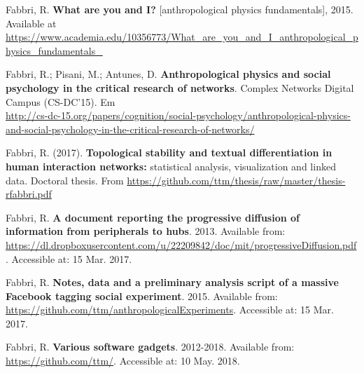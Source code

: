 \documentclass[a4paper]{article}
\begin{document}
\begin{thebibliography}{9}
	Fabbri, R. \textbf{What are you and I?} [anthropological physics fundamentals], 2015. Available at \url{https://www.academia.edu/10356773/What\_are\_you\_and\_I\_anthropological\_physics\_fundamentals\_}

	Fabbri, R.; Pisani, M.; Antunes, D. \textbf{Anthropological physics and social psychology in the critical research of networks}. Complex Networks Digital Campus (CS-DC'15).
	Em \\\url{http://cs-dc-15.org/papers/cognition/social-psychology/anthropological-physics-and-social-psychology-in-the-critical-research-of-networks/}

Fabbri, R. (2017). \textbf{Topological stability and textual differentiation in human interaction networks:}
		statistical analysis, visualization and linked data. Doctoral thesis.
		From \url{https://github.com/ttm/thesis/raw/master/thesis-rfabbri.pdf}

	Fabbri, R. \textbf{A document reporting the progressive diffusion of information from peripherals to hubs}. 2013. Available from: \url{https://dl.dropboxusercontent.com/u/22209842/doc/mit/progressiveDiffusion.pdf}. Accessible at: 15 Mar. 2017.

	Fabbri, R. \textbf{Notes, data and a preliminary analysis script of a massive Facebook tagging social experiment}. 2015. Available from: \url{https://github.com/ttm/anthropologicalExperiments}. Accessible at: 15 Mar. 2017.

	Fabbri, R. \textbf{Various software gadgets}. 2012-2018. Available from: \url{https://github.com/ttm/}. Accessible at: 10 May. 2018.

\end{thebibliography}
\end{document}
